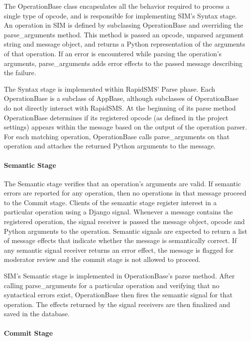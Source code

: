 \documentclass{acm_proc_article-sp}
\begin{document}
The OperationBase class encapsulates all the behavior required to process a single type of opcode, and is responsible for implementing SIM’s Syntax stage. An operation in SIM is defined by subclassing OperationBase and overriding the parse\_arguments method. This method is passed an opcode, unparsed argument string and message object, and returns a Python representation of the arguments of that operation. If an error is encountered while parsing the operation’s arguments, parse\_arguments adds error effects to the passed message describing the failure.

The Syntax stage is implemented within RapidSMS’ Parse phase. Each OperationBase is a subclass of AppBase, although subclasses of OperationBase do not directly interact with RapidSMS. At the beginning of its parse method OperationBase determines if its registered opcode (as defined in the project settings) appears within the message based on the output of the operation parser. For each matching operation, OperationBase calls parse\_arguments on that operation and attaches the returned Python arguments to the message.

\paragraph{Semantic Stage}

The Semantic stage verifies that an operation’s arguments are valid. If semantic errors are reported for any operation, then no operations in that message proceed to the Commit stage. Clients of the semantic stage register interest in a particular operation using a Django signal. Whenever a message contains the registered operation, the signal receiver is passed the message object, opcode and Python arguments to the operation. Semantic signals are expected to return a list of message effects that indicate whether the message is semantically correct. If any semantic signal receiver returns an error effect, the message is flagged for moderator review and the commit stage is not allowed to proceed.

SIM’s Semantic stage is implemented in OperationBase’s parse method. After calling parse\_arguments for a particular operation and verifying that no syntactical errors exist, OperationBase then fires the semantic signal for that operation. The effects returned by the signal receivers are then finalized and saved in the database.

\paragraph{Commit Stage}
\end{document}
